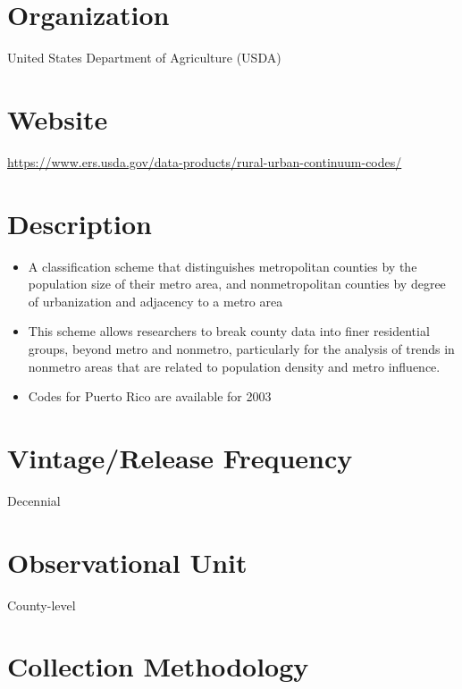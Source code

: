\documentclass[
]{book}
\providecommand{\tightlist}{%
  \setlength{\itemsep}{0pt}\setlength{\parskip}{0pt}}
\begin{document}
\hypertarget{organization-74}{%
\section{Organization}\label{organization-74}}

United States Department of Agriculture (USDA)

\hypertarget{website-74}{%
\section{Website}\label{website-74}}

\url{https://www.ers.usda.gov/data-products/rural-urban-continuum-codes/}

\hypertarget{description-74}{%
\section{Description}\label{description-74}}

\begin{itemize}
\tightlist
\item
  A classification scheme that distinguishes metropolitan counties by the population size of their metro area, and nonmetropolitan counties by degree of urbanization and adjacency to a metro area
\item
  This scheme allows researchers to break county data into finer residential groups, beyond metro and nonmetro, particularly for the analysis of trends in nonmetro areas that are related to population density and metro influence.
\item
  Codes for Puerto Rico are available for 2003
\end{itemize}

\hypertarget{vintagerelease-frequency-74}{%
\section{Vintage/Release Frequency}\label{vintagerelease-frequency-74}}

Decennial

\hypertarget{observational-unit-74}{%
\section{Observational Unit}\label{observational-unit-74}}

County-level

\hypertarget{collection-methodology-74}{%
\section{Collection Methodology}\label{collection-methodology-74}}
\end{document}
